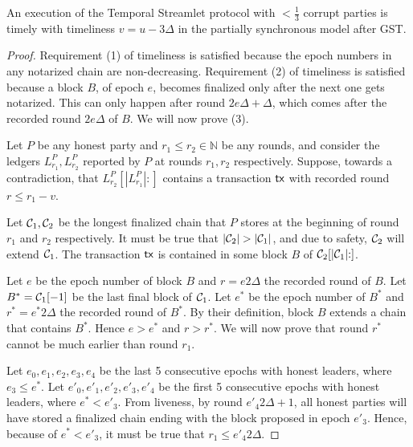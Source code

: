 \begin{theorem}
  An execution of the Temporal Streamlet protocol with $< \frac{1}{3}$ corrupt parties is timely
  with timeliness $v = u - 3 \Delta$ in the partially synchronous model after GST.
\end{theorem}
\begin{proof}
  Requirement (1) of timeliness is satisfied because the epoch numbers in any notarized chain
  are non-decreasing.
  Requirement (2) of timeliness is satisfied because a block $B$, of epoch $e$, becomes finalized
  only after the next one gets notarized. This can only happen after round $2 e \Delta + \Delta$,
  which comes after the recorded round $2 e \Delta$ of $B$.
  We will now prove (3).

  Let $P$ be any honest party and $r_1 \leq r_2 \in \mathbb{N}$ be any rounds, and consider
  the ledgers $L^P_{r_1}, L^P_{r_2}$ reported by $P$ at rounds $r_1, r_2$ respectively.
  Suppose, towards a contradiction, that $L^P_{r_2}[|L^P_{r_1}|{:}]$ contains a transaction
  $\textsf{tx}$ with recorded round $r \leq r_1 - v$.

  Let $\mathcal{C}_1, \mathcal{C}_2$ be the longest finalized chain that $P$ stores at the beginning of round $r_1$
  and $r_2$ respectively.
  It must be true that $|\mathcal{C}_2| > |\mathcal{C}_1|$, and due to safety, $\mathcal{C}_2$ will extend $\mathcal{C}_1$.
  The transaction $\textsf{tx}$ is contained in some block $B$ of $\mathcal{C}_2[|\mathcal{C}_1|{:}]$.

  Let $e$ be the epoch number of block $B$ and $r = e 2 \Delta$ the recorded round of $B$.
  Let $B^* = \mathcal{C}_1[-1]$ be the last final block of $\mathcal{C}_1$. Let $e^*$ be the epoch
  number of $B^*$ and $r^* = e^* 2 \Delta$ the recorded round of $B^*$.
  By their definition, block $B$ extends a chain that contains $B^*$. Hence
  $e > e^*$ and $r > r^*$.
  We will now prove that round $r^*$ cannot be much earlier than round $r_1$.


  Let $e_0,e_1,e_2,e_3,e_4$ be the last 5 consecutive epochs with honest leaders,
  where $e_3 \leq e^*$. Let $e'_0,e'_1,e'_2,e'_3,e'_4$ be the first 5 consecutive epochs
  with honest leaders, where $e^* < e'_3$.
  From liveness, by round $e'_4 2 \Delta + 1$, all honest parties will have stored
  a finalized chain ending with the block proposed in epoch $e'_3$. Hence, because
  of $e^* < e'_3$, it must be true that $r_1 \leq e'_4 2 \Delta$.


\end{proof}
